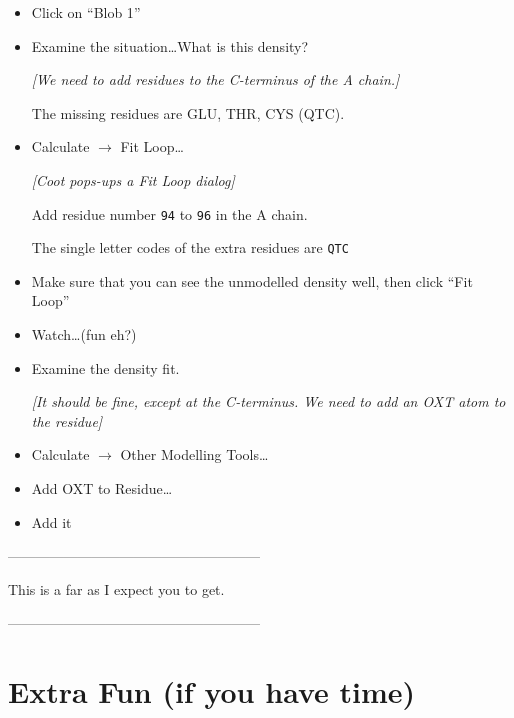 \documentclass{article}
\begin{document}
\begin{itemize}
\item Click on ``\textsf{Blob 1}''

\item Examine the situation\ldots  What is this density?

  \emph{[We need to add residues to the C-terminus of the A chain.]}

The missing residues are GLU, THR, CYS (QTC).

\item \textsf{Calculate $\rightarrow$ Fit Loop\ldots}

\textsl{ [Coot pops-ups a Fit Loop dialog]}

Add residue number \texttt{94} to \texttt{96} in the A chain.

The single letter codes of the extra residues are \texttt{QTC}

\item Make sure that you can see the unmodelled density well, then click \textsf{``Fit Loop''}

\item Watch\ldots (fun eh?)

\item Examine the density fit. 
  
  \textsl{ [It should be fine, except at the C-terminus.  We need to
    add an OXT atom to the residue]}

\item \textsf{Calculate $\rightarrow$ Other Modelling Tools\ldots}

\item \textsf{Add OXT to Residue\ldots}

\item \textsf{Add it}

\end{itemize}



\begin{center}
------------------------------------------------------

This is a far as I expect you to get.

------------------------------------------------------
\end{center}


\section{Extra Fun (if you have time)}
\end{document}

